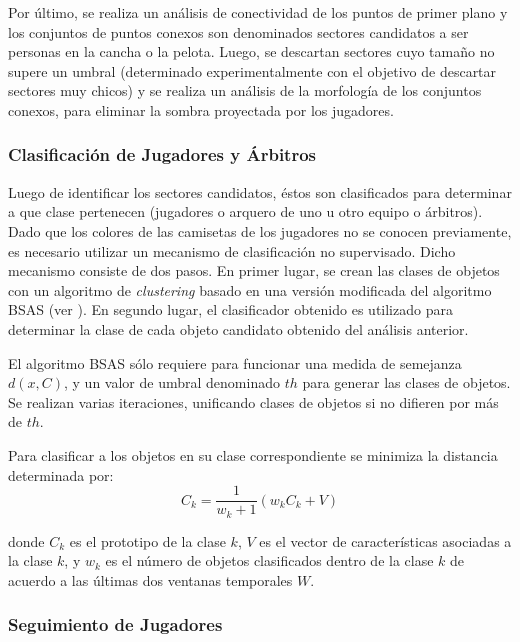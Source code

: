 \documentclass[a4paper,10pt]{article}
\begin{document}

Por último, se realiza un análisis de conectividad de los puntos de primer
plano y los conjuntos de puntos conexos son denominados sectores candidatos
a ser personas en la cancha o la pelota. Luego, se descartan sectores
cuyo tamaño no supere un umbral (determinado experimentalmente con el
objetivo de descartar sectores muy chicos) y se realiza un análisis de la
morfología de los conjuntos conexos, para eliminar la sombra proyectada por los
jugadores.

\subsubsection{Clasificación de Jugadores y Árbitros}

Luego de identificar los sectores candidatos, éstos son clasificados para
determinar a que clase pertenecen (jugadores o arquero de uno u otro equipo
o árbitros). Dado que los colores de las camisetas de
los jugadores no se conocen previamente, es necesario utilizar un mecanismo
de clasificación no supervisado. Dicho mecanismo consiste de dos pasos. En
primer lugar, se crean las clases de objetos con un algoritmo de
\textit{clustering} basado en una versión modificada del algoritmo BSAS
(ver \cite{BSAS}). En segundo lugar, el clasificador obtenido es utilizado
para determinar la clase de cada objeto candidato obtenido del análisis anterior.

El algoritmo BSAS sólo requiere para funcionar una medida de semejanza $d(x, C)$,
y un valor de umbral denominado $th$ para generar las clases de objetos.
Se realizan varias iteraciones, unificando clases de objetos si no difieren
por más de $th$.

Para clasificar a los objetos en su clase correspondiente se minimiza la
distancia determinada por:
\[
  C_k = \frac{1}{w_k+1}(w_k C_k + V)
\]

donde $C_k$ es el prototipo de la clase $k$, $V$ es el vector de
características asociadas a la clase $k$, y $w_k$ es el número de
objetos clasificados dentro de la clase $k$ de acuerdo a las últimas dos
ventanas temporales $W$.

\subsubsection{Seguimiento de Jugadores}
\end{document}
